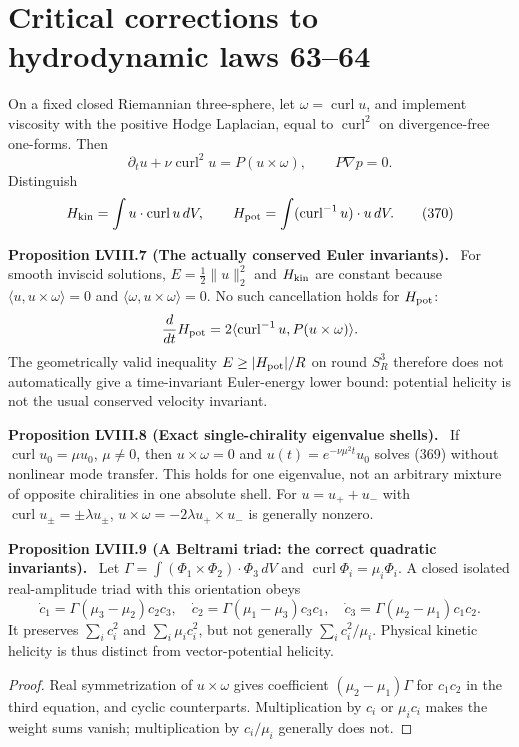 \documentclass[11pt,a4paper,oneside]{book}
\newcommand{\statement}[3]{\par\medskip\noindent\textbf{#1 #2 (#3).}\ }
\begin{document}
\section{Critical corrections to hydrodynamic laws 63--64}
On a fixed closed Riemannian three-sphere, let $\omega=\operatorname{curl}u$, and implement viscosity with the positive Hodge Laplacian, equal to $\operatorname{curl}^2$ on divergence-free one-forms. Then
\begin{equation}\partial_tu+\nu\operatorname{curl}^2u=P(u\times\omega),\qquad P\nabla p=0.\tag{369}\end{equation}
Distinguish
\begin{equation}H_{\rm kin}=\int u\cdot\operatorname{curl}u\,dV,\qquad H_{\rm pot}=\int(\operatorname{curl}^{-1}u)\cdot u\,dV.\tag{370}\end{equation}
\statement{Proposition}{LVIII.7}{The actually conserved Euler invariants}
For smooth inviscid solutions, $E=\tfrac12\|u\|_2^2$ and $H_{\rm kin}$ are constant because $\langle u,u\times\omega\rangle=0$ and $\langle\omega,u\times\omega\rangle=0$. No such cancellation holds for $H_{\rm pot}$:
\[\frac d{dt}H_{\rm pot}=2\langle\operatorname{curl}^{-1}u,P(u\times\omega)\rangle.\]
The geometrically valid inequality $E\ge|H_{\rm pot}|/R$ on round $S_R^3$ therefore does not automatically give a time-invariant Euler-energy lower bound: potential helicity is not the usual conserved velocity invariant.
\statement{Proposition}{LVIII.8}{Exact single-chirality eigenvalue shells}
If $\operatorname{curl}u_0=\mu u_0$, $\mu\ne0$, then $u\times\omega=0$ and $u(t)=e^{-\nu\mu^2t}u_0$ solves (369) without nonlinear mode transfer. This holds for one eigenvalue, not an arbitrary mixture of opposite chiralities in one absolute shell. For $u=u_++u_-$ with $\operatorname{curl}u_\pm=\pm\lambda u_\pm$, $u\times\omega=-2\lambda u_+\times u_-$ is generally nonzero.
\statement{Proposition}{LVIII.9}{A Beltrami triad: the correct quadratic invariants}
Let $\Gamma=\int(\Phi_1\times\Phi_2)\cdot\Phi_3\,dV$ and $\operatorname{curl}\Phi_i=\mu_i\Phi_i$. A closed isolated real-amplitude triad with this orientation obeys
\begin{equation}\dot c_1=\Gamma(\mu_3-\mu_2)c_2c_3,\quad\dot c_2=\Gamma(\mu_1-\mu_3)c_3c_1,\quad\dot c_3=\Gamma(\mu_2-\mu_1)c_1c_2.\tag{371}\end{equation}
It preserves $\sum_ic_i^2$ and $\sum_i\mu_ic_i^2$, but not generally $\sum_ic_i^2/\mu_i$. Physical kinetic helicity is thus distinct from vector-potential helicity.
\begin{proof}
Real symmetrization of $u\times\omega$ gives coefficient $(\mu_2-\mu_1)\Gamma$ for $c_1c_2$ in the third equation, and cyclic counterparts. Multiplication by $c_i$ or $\mu_ic_i$ makes the weight sums vanish; multiplication by $c_i/\mu_i$ generally does not.
\end{proof}
\end{document}
